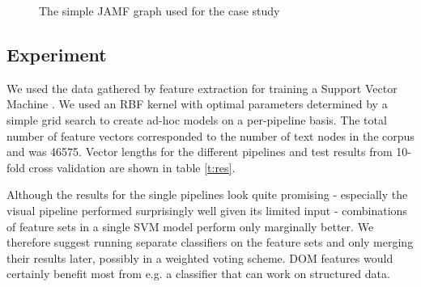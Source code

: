 \begin{figure}[h]
\centering
{}
\label{f:jamfgraph}
\caption{The simple JAMF graph used for the case study}
\end{figure}

\subsection{Experiment}

We used the data gathered by feature extraction for training a Support Vector Machine \cite{libsvm}.
We used an RBF kernel with optimal parameters determined by a simple grid search to create ad-hoc models on a per-pipeline basis.
The total number of feature vectors corresponded to the number of text nodes in the corpus and was 46575.
Vector lengths for the different pipelines and test results from 10-fold cross validation are shown in table \ref{t:res}.

Although the results for the single pipelines look quite promising - especially the visual pipeline performed surprisingly well given its limited input - combinations of feature sets in a single SVM model perform only marginally better.
We therefore suggest running separate classifiers on the feature sets and only merging their results later, possibly in a weighted voting scheme.
DOM features would certainly benefit most from e.g. a classifier that can work on structured data.

